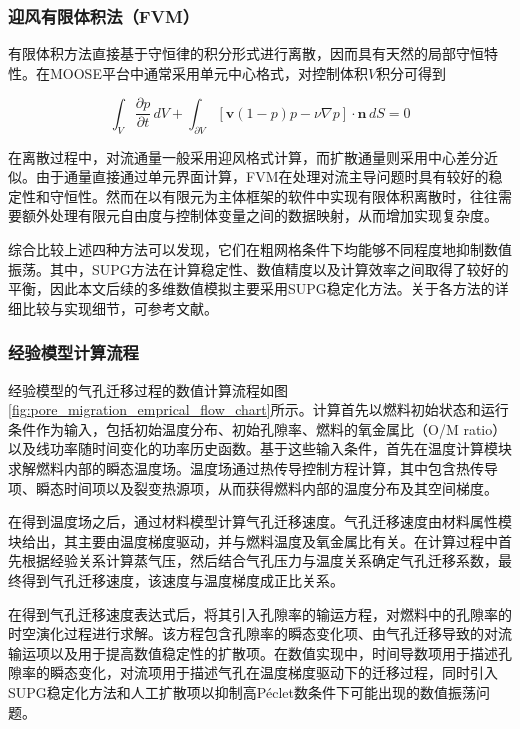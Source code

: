 \subsubsection{迎风有限体积法（FVM）}

有限体积方法直接基于守恒律的积分形式进行离散，因而具有天然的局部守恒特性\cite{moukalledFiniteVolumeMethod2016}。在MOOSE平台中通常采用单元中心格式，对控制体积$V$积分可得到

\begin{equation}
	\int_V
	\frac{\partial p}{\partial t}
	\,dV
	+
	\int_{\partial V}
	\left[
	\mathbf v(1-p)p-\nu\nabla p
	\right]\cdot\mathbf n
	\,dS
	=0 
	\label{eq:fvm_weak}
\end{equation}

在离散过程中，对流通量一般采用迎风格式计算，而扩散通量则采用中心差分近似。由于通量直接通过单元界面计算，FVM在处理对流主导问题时具有较好的稳定性和守恒性。然而在以有限元为主体框架的软件中实现有限体积离散时，往往需要额外处理有限元自由度与控制体变量之间的数据映射，从而增加实现复杂度。

综合比较上述四种方法可以发现，它们在粗网格条件下均能够不同程度地抑制数值振荡。其中，SUPG方法在计算稳定性、数值精度以及计算效率之间取得了较好的平衡，因此本文后续的多维数值模拟主要采用SUPG稳定化方法。关于各方法的详细比较与实现细节，可参考文献\cite{AnonymousPoreMigration2025}。

\subsubsection{经验模型计算流程}
经验模型的气孔迁移过程的数值计算流程如图\ref{fig:pore_migration_emprical_flow_chart}所示。计算首先以燃料初始状态和运行条件作为输入，包括初始温度分布、初始孔隙率、燃料的氧金属比（O/M ratio）以及线功率随时间变化的功率历史函数。基于这些输入条件，首先在温度计算模块求解燃料内部的瞬态温度场。温度场通过热传导控制方程计算，其中包含热传导项、瞬态时间项以及裂变热源项，从而获得燃料内部的温度分布及其空间梯度。

在得到温度场之后，通过材料模型计算气孔迁移速度。气孔迁移速度由材料属性模块给出，其主要由温度梯度驱动，并与燃料温度及氧金属比有关。在计算过程中首先根据经验关系计算蒸气压，然后结合气孔压力与温度关系确定气孔迁移系数，最终得到气孔迁移速度，该速度与温度梯度成正比关系。

在得到气孔迁移速度表达式后，将其引入孔隙率的输运方程，对燃料中的孔隙率的时空演化过程进行求解。该方程包含孔隙率的瞬态变化项、由气孔迁移导致的对流输运项以及用于提高数值稳定性的扩散项。在数值实现中，时间导数项用于描述孔隙率的瞬态变化，对流项用于描述气孔在温度梯度驱动下的迁移过程，同时引入SUPG稳定化方法和人工扩散项以抑制高Péclet数条件下可能出现的数值振荡问题。

